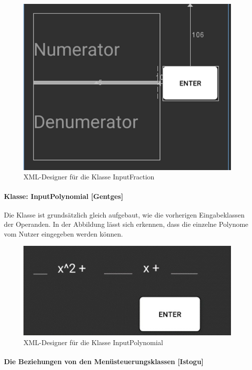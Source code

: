 \begin{figure}[h]
\includegraphics[width=0.5\columnwidth]{img/xml_InputFraction}
\caption[XML-Designer für die Klasse InputFraction]{XML-Designer für die Klasse InputFraction\footnotemark}
\end{figure}
\FloatBarrier

\paragraph{Klasse: InputPolynomial [Gentges]}

Die Klasse ist grundsätzlich gleich aufgebaut, wie die vorherigen Eingabeklassen der Operanden. In der Abbildung lässt sich erkennen, dass die einzelne Polynome vom Nutzer eingegeben werden können.

\begin{figure}[h]
	\includegraphics[width=0.6\columnwidth]{img/xml_InputPolynomial}
	\caption[XML-Designer für die Klasse InputPolynomial]{XML-Designer für die Klasse InputPolynomial\footnotemark}
\end{figure}
\FloatBarrier
\clearpage

\paragraph{Die Beziehungen von den Menüsteuerungsklassen [Istogu]}

